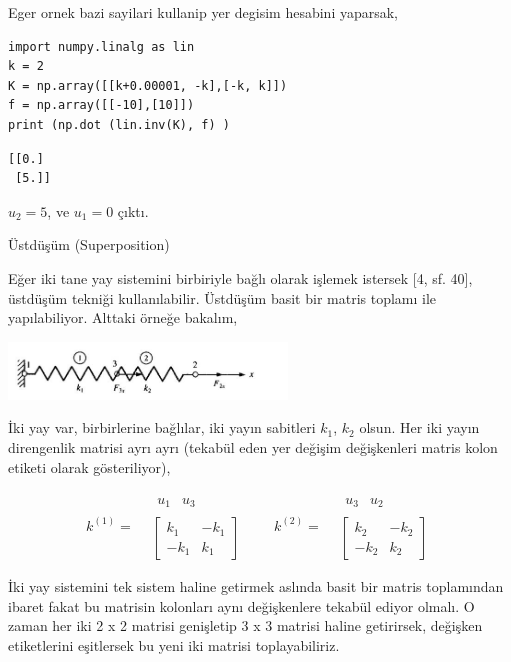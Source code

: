 \documentclass[12pt,fleqn]{article}\usepackage{../../common}
\begin{document}
Eger ornek bazi sayilari kullanip yer degisim hesabini yaparsak,

\begin{verbatim}
import numpy.linalg as lin
k = 2
K = np.array([[k+0.00001, -k],[-k, k]])
f = np.array([[-10],[10]])
print (np.dot (lin.inv(K), f) )
\end{verbatim}

\begin{verbatim}
[[0.]
 [5.]]
\end{verbatim}

$u_2 = 5$, ve $u_1 = 0$ çıktı.

Üstdüşüm (Superposition)

Eğer iki tane yay sistemini birbiriyle bağlı olarak işlemek istersek [4, sf. 40],
üstdüşüm tekniği kullanılabilir. Üstdüşüm basit bir matris toplamı ile
yapılabiliyor. Alttaki örneğe bakalım,

\includegraphics[width=20em]{phy_020_strs_02_02.jpg}

İki yay var, birbirlerine bağlılar, iki yayın sabitleri $k_1$, $k_2$
olsun. Her iki yayın direngenlik matrisi ayrı ayrı (tekabül eden yer değişim
değişkenleri matris kolon etiketi olarak gösteriliyor),

$$
k^{(1)} =
\begin{array}{cc} & \begin{array}{cc} u_1 & u_3 \end{array} \\ &
\left[
\begin{array}{cc}
k_1 & -k_1 \\ -k_1 & k_1
\end{array}
\right]
\end{array} 
\qquad
k^{(2)} =
\begin{array}{cc} & \begin{array}{cc} u_3 & u_2 \end{array} \\ &
\left[
\begin{array}{cc}
k_2 & -k_2 \\ -k_2 & k_2
\end{array}
\right]
\end{array}
$$

İki yay sistemini tek sistem haline getirmek aslında basit bir matris
toplamından ibaret fakat bu matrisin kolonları aynı değişkenlere tekabül ediyor
olmalı. O zaman her iki 2 x 2 matrisi genişletip 3 x 3 matrisi haline
getirirsek, değişken etiketlerini eşitlersek bu yeni iki matrisi
toplayabiliriz.
\end{document}
